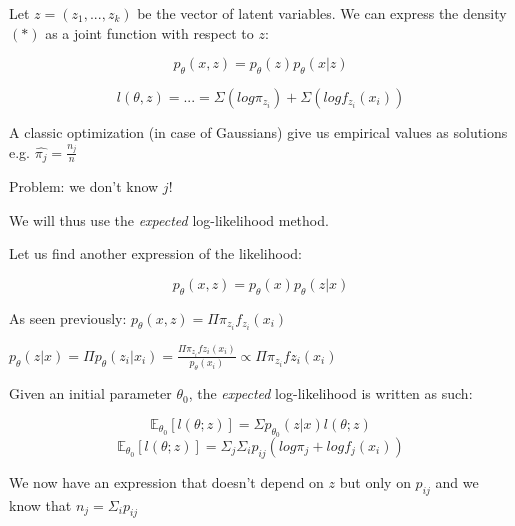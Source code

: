 Let $z=(z_1,...,z_k)$ be the vector of latent variables. We can express the density $(*)$ as a joint function with respect to $z$:

$$p_\theta(x,z)=p_\theta(z)p_\theta(x|z)$$

$$l(\theta, z) = ... =\Sigma(log \pi_{z_i})+ \Sigma(logf_{z_i}(x_i))$$

A classic optimization (in case of Gaussians) give us empirical values as solutions e.g. $\hat{\pi_j}=\frac{n_j}{n}$

Problem: we don't know $j$!

\vspace{5mm}

We will thus use the \textit{expected} log-likelihood method.

Let us find another expression of the likelihood:

$$p_\theta(x,z)=p_\theta(x)p_\theta(z|x)$$

As seen previously: $p_\theta(x,z)=\Pi \pi_{z_i}f_{z_i}(x_i)$

$p_\theta(z|x)=\Pi p_\theta(z_i|x_i)=\frac{\Pi \pi_{z_i}f{z_i}(x_i)}{p_\theta(x_i)} \propto \Pi \pi_{z_i}f{z_i}(x_i)$

\vspace{5mm}

Given an initial parameter $\theta_0$, the \textit{expected} log-likelihood is written as such:

$$\mathbb{E}_{\theta_0}[l(\theta;z)]=\Sigma p_{\theta_0}(z|x) l(\theta;z)$$
$$\mathbb{E}_{\theta_0}[l(\theta;z)]=\Sigma_{j} \Sigma_{i} p_{ij}(log\pi_j+logf_j(x_i))$$

We now have an expression that doesn't depend on $z$ but only on $p_{ij}$ and we know that $n_j=\Sigma_i p_{ij}$

\vspace{5mm}
